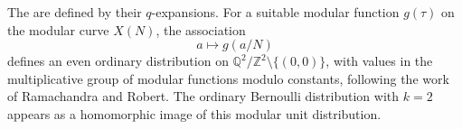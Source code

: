 The  are defined by their $q$-expansions. For a suitable modular function $g(\tau)$ on the modular curve $X(N)$, the association
$$
a \mapsto g(a/N)
$$
defines an even ordinary distribution on $\mathbb{Q}^2/\mathbb{Z}^2 \setminus \{(0,0)\}$, with values in the multiplicative group of modular functions modulo constants, following the work of Ramachandra and Robert. The ordinary Bernoulli distribution with $k = 2$ appears as a homomorphic image of this modular unit distribution.
